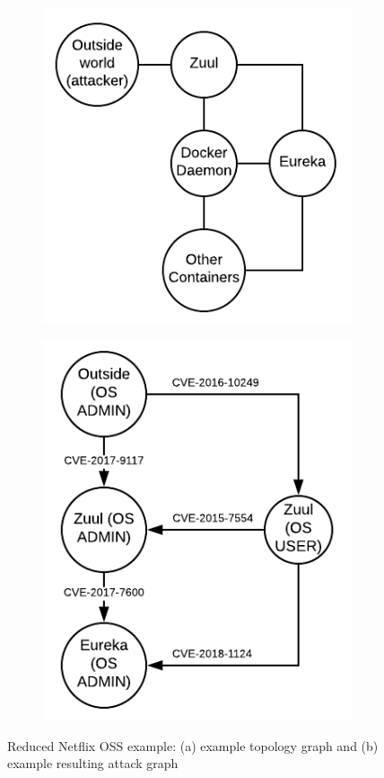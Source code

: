 \begin{figure}[!h]
	\centering
	\begin{subfigure}[b]{\columnwidth}
		\centering
		\includegraphics[width=.5\linewidth]{./images/Topology_graph}
		\caption{}
		\label{TopologyGraph}
	\end{subfigure}
	\hfill
	\begin{subfigure}[b]{\columnwidth}
		\centering
		\includegraphics[width=.5\linewidth]{./images/Attack_graph}
		\caption{}
		\label{AttackGraph}
	\end{subfigure}
	
	\caption[Two numerical solutions]{Reduced Netflix OSS example: (a) example topology graph  and (b) example resulting attack graph}
\end{figure}


